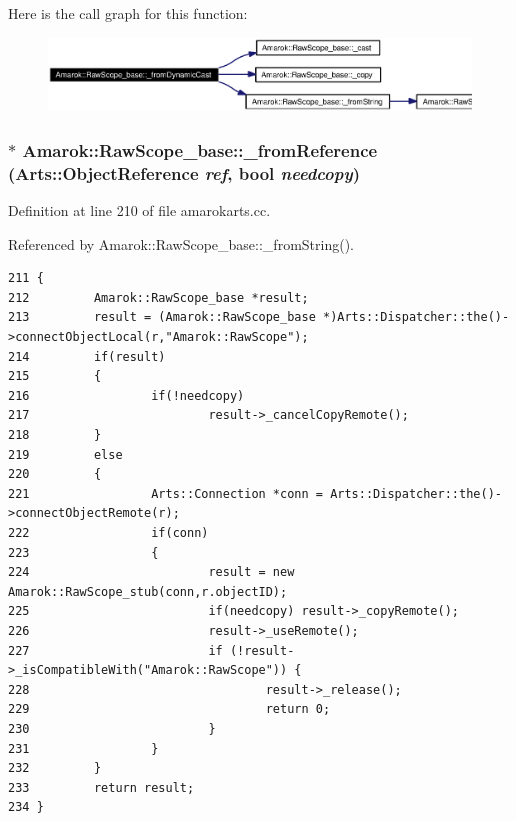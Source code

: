 Here is the call graph for this function:\begin{figure}[H]
\begin{center}
\leavevmode
\includegraphics[width=366pt]{classAmarok_1_1RawScope__base_Amarok_1_1RawScope__stube3_cgraph}
\end{center}
\end{figure}
\subsubsection{ $\ast$ Amarok::Raw\-Scope\_\-base::\_\-from\-Reference (Arts::Object\-Reference {\em ref}, bool {\em needcopy})\hspace{0.3cm}{\tt  [static, inherited]}}\label{classAmarok_1_1RawScope__base_Amarok_1_1RawScope__stube2}




Definition at line 210 of file amarokarts.cc.

Referenced by Amarok::Raw\-Scope\_\-base::\_\-from\-String().



\footnotesize\begin{verbatim}211 {
212         Amarok::RawScope_base *result;
213         result = (Amarok::RawScope_base *)Arts::Dispatcher::the()->connectObjectLocal(r,"Amarok::RawScope");
214         if(result)
215         {
216                 if(!needcopy)
217                         result->_cancelCopyRemote();
218         }
219         else
220         {
221                 Arts::Connection *conn = Arts::Dispatcher::the()->connectObjectRemote(r);
222                 if(conn)
223                 {
224                         result = new Amarok::RawScope_stub(conn,r.objectID);
225                         if(needcopy) result->_copyRemote();
226                         result->_useRemote();
227                         if (!result->_isCompatibleWith("Amarok::RawScope")) {
228                                 result->_release();
229                                 return 0;
230                         }
231                 }
232         }
233         return result;
234 }
\end{verbatim}\normalsize 
{}
